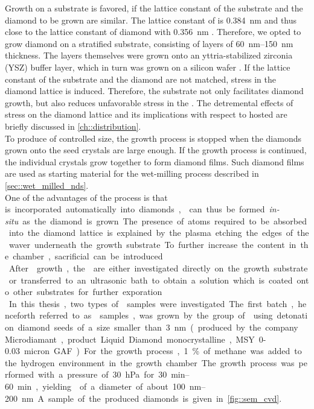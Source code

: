 	Growth on a substrate is favored, if the lattice constant of the substrate and the diamond to be grown are similar.
	The lattice constant of \ir is \SI{0.384}{nm} \cite{Arblaster2010,Gsell2007} and thus close to the lattice constant of diamond with \SI{0.356}{nm} \cite{Davis1993}.
	Therefore, we opted to grow diamond on a stratified substrate, consisting of \ir layers of \SIrange{60}{150}{nm} thickness. The \ir layers themselves were grown onto an yttria-stabilized zirconia (YSZ) buffer layer, which in turn was grown on a silicon wafer \cite{Gsell2004a}.
	If the lattice constant of the substrate and the diamond are not matched, stress in the diamond lattice is induced.
	Therefore, the \ir substrate not only facilitates diamond growth, but also reduces unfavorable stress in the \nds. The detremental effects of stress on the diamond lattice and its implications with respect to hosted \sivs are briefly discussed in \autoref{ch::distribution}.
	\\
	To produce \nds of controlled size, the growth process is stopped when the diamonds grown onto the seed crystals are large enough.
	If the growth process is continued, the individual crystals grow together to form diamond films.
	Such diamond films are used as starting material for the wet-milling process described in \autoref{sec::wet_milled_nds}.
	\\
	One of the advantages of the \CVD process is that \si is incorporated automatically into diamonds, \sivs can thus be formed \textit{in-situ} as the diamond is grown. The presence of \si atoms required to be absorbed into the diamond lattice is explained by the plasma etching the edges of the \si waver underneath the growth substrate.
	To further increase the \si content in the chamber, sacrificial \si can be introduced.
	\\
	After \nd growth, the \nds are either investigated directly on the growth substrate or transferred to an ultrasonic bath to obtain a solution which is coated onto other substrates for further exporation.
	\\
	In this thesis, two types of \nds samples were investigated.
	The first batch, henceforth referred to as \CVD samples, was grown by the group of \schreck using detonation diamond seeds of a size smaller than \SI{3}{nm}(produced by the company Microdiamant, product Liquid Diamond monocrystalline, MSY {0-0.03} micron GAF).
	For the growth process, \SI{1}{\percent} of methane was added to the hydrogen environment in the growth chamber.
	The growth process was performed with a pressure of \SI{30}{hPa} for \SIrange{30}{60}{min}, yielding \nds of a diameter of about \SIrange{100}{200}{nm}. A sample of the produced diamonds is given in \autoref{fig::sem_cvd}.

